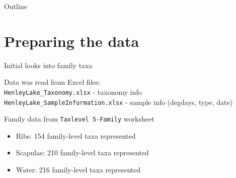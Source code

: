 \documentclass{beamer}
\begin{document}

\begin{frame}{Outline}
  \tableofcontents
\end{frame}








\section[Preparation]{Preparing the data}


\begin{frame}{Initial looks into family taxa}

  \noindent Data was read from Excel files:\\
  \texttt{HenleyLake\_Taxonomy.xlsx} - taxonomy info\\
  \texttt{HenleyLake\_SampleInformation.xlsx} - sample info (degdays, type, date)

  \vspace{0.1in}

  \noindent Family data from \texttt{Taxlevel 5-Family} worksheet
  \begin{itemize}
  \item Ribs: 154 family-level taxa represented
  \item Scapulae: 210 family-level taxa represented
  \item Water: 216 family-level taxa represented
  \end{itemize}
 
\end{frame}
\end{document}
